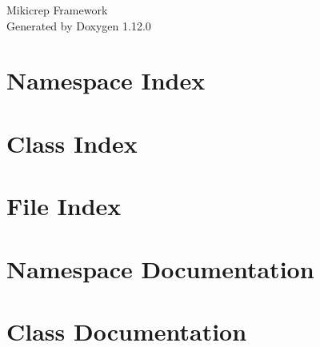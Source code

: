 \documentclass[twoside]{book}
\newcommand{\+}{\discretionary{\mbox{\scriptsize$\hookleftarrow$}}{}{}}
\newcommand{\clearemptydoublepage}{%
    \newpage{\pagestyle{empty}\cleardoublepage}%
  }
\begin{document}
  \raggedbottom
    \hypersetup{pageanchor=false,
                bookmarksnumbered=true,
                pdfencoding=unicode
               }
  \begin{titlepage}
  \vspace*{7cm}
  \begin{center}%
  {\Large Mikicrep Framework}\\
  \vspace*{1cm}
  {\large Generated by Doxygen 1.12.0}\\
  \end{center}
  \end{titlepage}
  \clearemptydoublepage
  \tableofcontents
  \clearemptydoublepage
  \hypersetup{pageanchor=true}
\chapter{Namespace Index}

\chapter{Class Index}

\chapter{File Index}

\chapter{Namespace Documentation}








\chapter{Class Documentation}


\end{document}
